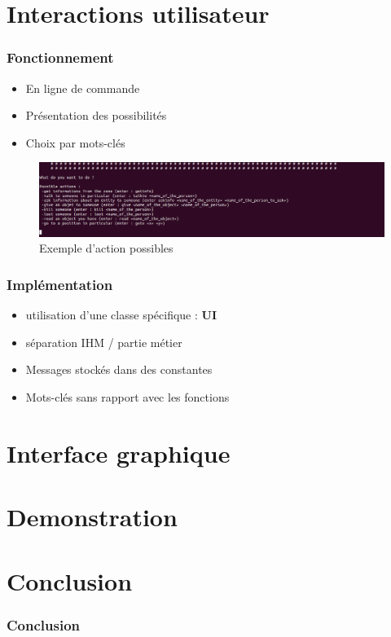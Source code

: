 \documentclass{beamer}
\begin{document}
\section{Interactions utilisateur}
\begin{frame}
   \frametitle{Fonctionnement}
  \begin{itemize}
  \item En ligne de commande
  \item Présentation des possibilités
  \item Choix par mots-clés
  \end{itemize} 
\begin{figure}
    \begin{center}
      \includegraphics[scale=0.3]{./images/screenshootUI01.png}
      \caption{Exemple d'action possibles}
    \end{center}
  \end{figure}
\end{frame}

\begin{frame}
   \frametitle{Implémentation}
  \begin{itemize}
  \item utilisation d'une classe spécifique : \textbf{UI}
  \item séparation IHM / partie métier
  \item Messages stockés dans des constantes
  \item Mots-clés sans rapport avec les fonctions
  \end{itemize} 
\end{frame}

\author{PATTYN Maxime}
\section{Interface graphique}
\begin{frame}
  
\end{frame}

\section{Demonstration}
\begin{frame}
  
\end{frame}


\section{Conclusion}
\begin{frame}
  \frametitle{Conclusion}
\end{frame}
\end{document}
